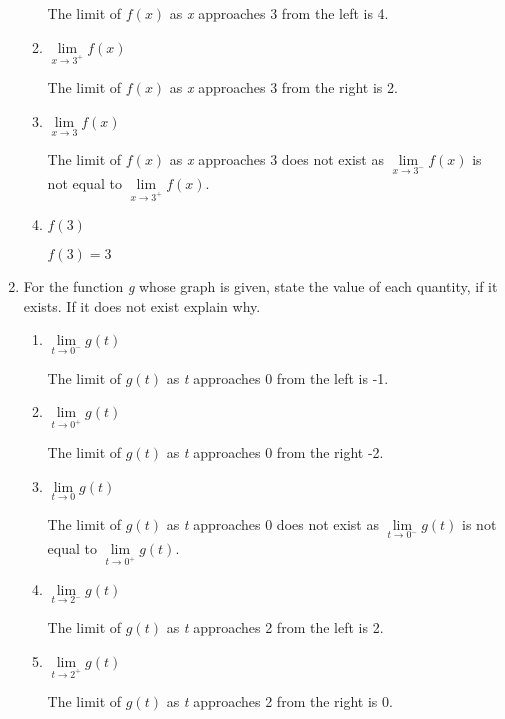 \documentclass{article}
\begin{document}
\begin{enumerate}
\begin{enumerate}
						The limit of $f(x)$ as \emph{x} approaches 3 from the left is 4.
						
					\item $\lim \limits_{x \to 3^{+}} f(x)$
					
						The limit of $f(x)$ as \emph{x} approaches 3 from the right is 2.
						
					\item $\lim \limits_{x \to 3} f(x)$
					
						The limit of $f(x)$ as \emph{x} approaches 3 does not exist as 
						$\lim\limits_{x \to 3^{-}} f(x)$ is not equal to $\lim\limits_{x \to 3^{+}} f(x)$.
						
					\item $f(3)$
					
						$f(3) = 3$
						
				\end{enumerate}
				
			\item For the function \emph{g} whose graph is given, state the value of each quantity, if it exists. If it does
				not exist explain why.
				
				\begin{enumerate}
				
					\item $\lim \limits_{t \to 0^{-}} g(t)$
					
						The limit of $g(t)$ as \emph{t} approaches 0 from the left is -1.
						
					\item $\lim \limits_{t \to 0^{+}} g(t)$
					
						The limit of $g(t)$ as \emph{t} approaches 0 from the right -2.
						
					\item $\lim \limits_{t \to 0} g(t)$
					
						The limit of $g(t)$ as \emph{t} approaches 0 does not exist as 
						$\lim\limits_{t \to 0^{-}} g(t)$ is not equal to $\lim\limits_{t \to 0^{+}} g(t)$.
						
					\item $\lim \limits_{t \to 2^{-}} g(t)$
					
						The limit of $g(t)$ as \emph{t} approaches 2 from the left is 2.
						
					\item $\lim \limits_{t \to 2^{+}} g(t)$
					
						The limit of $g(t)$ as \emph{t} approaches 2 from the right is 0.
						

\end{enumerate}
\end{enumerate}
\end{document}
